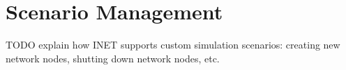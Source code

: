 \chapter{Scenario Management}
\label{cha:scenario-management}

TODO explain how INET supports custom simulation scenarios: creating new 
network nodes, shutting down network nodes, etc.

